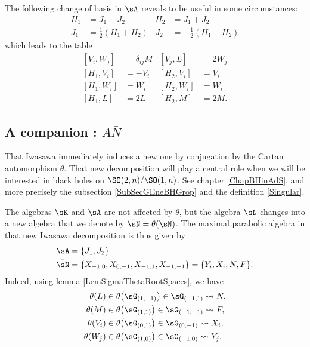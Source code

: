 The following change of basis in $\sA$ reveals to be useful in some circumstances:
\begin{subequations}  \label{EqChmHJ}
\begin{align}
  	H_1&=J_1-J_2			&H_2&=J_1+J_2\\
	J_1&=\frac{ 1 }{2}(H_1+H_2)	&J_2&=-\frac{ 1 }{2}(H_1-H_2)
\end{align}
\end{subequations}
which leads to the table
\begin{subequations}		\label{TableSeconde}
\begin{align}
{}[V_i,W_j]&=\delta_{ij}M		&[V_j,L]&=2W_j\\
[H_1,V_i]&=-V_i				&[H_2,V_i]&=V_i\\
[H_1,W_i]&=W_i				&[H_2,W_i]&=W_i\\
[H_1,L]&=2L				&[H_2,M]&=2M.
\end{align}
\end{subequations}

					\subsection{A companion : \texorpdfstring{$A\bar N$}{AN}}

That Iwasawa immediately induces a new one by conjugation by the Cartan automorphism $\theta$. That new decomposition will play a central role when we will be interested in black holes on $\SO(2,n)/\SO(1,n)$. See chapter \ref{ChapBHinAdS}, and more precisely the subsection \ref{SubSecGEneBHGrop} and the definition \ref{Singular}. 

The algebras $\sK$ and $\sA$ are not affected by $\theta$, but the algebra $\sN$ changes into a new algebra that we denote by $\bar\sN=\theta(\sN)$. The maximal parabolic algebra in that new Iwasawa decomposition is thus given by
\begin{equation}
	\begin{aligned}[]
		\sA&=\{ J_1,J_2 \}\\
		\bar\sN&=\{ X_{-1,0},X_{0,-1},X_{-1,1},X_{-1,-1} \}=\{ Y_i,X_i,N,F \}.
	\end{aligned}
\end{equation}
Indeed, using lemma \ref{LemSigmaThetaRootSpaces}, we have
\begin{equation}
	\begin{aligned}[]
		\theta(L)&\in\theta\big( \sG_{(1,-1)} \big)\in\sG_{(-1,1)}\leadsto N,\\
		\theta(M)&\in\theta\big( \sG_{(1,1)} \big)\in\sG_{(-1,-1)}\leadsto F,\\
		\theta(V_i)&\in\theta\big( \sG_{(0,1)} \big)\in\sG_{(0,-1)}\leadsto X_i,\\
		\theta(W_j)&\in\theta\big( \sG_{(1,0)} \big)\in\sG_{(-1,0)}\leadsto Y_j.
	\end{aligned}
\end{equation}

